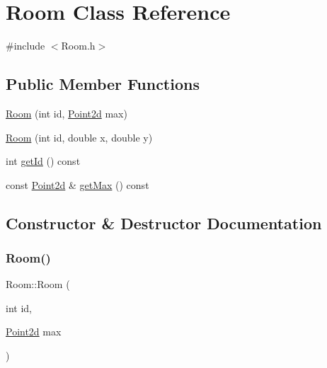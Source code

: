 \hypertarget{class_room}{}\section{Room Class Reference}
\label{class_room}


{\ttfamily \#include $<$Room.\+h$>$}

\subsection*{Public Member Functions}
\begin{DoxyCompactItemize}
\item 
\hyperlink{class_room_aa376bf97fea323a0c6ce14d7edbf58b9}{Room} (int id, \hyperlink{class_point2d}{Point2d} max)
\item 
\hyperlink{class_room_a441eb59beaafd66cee7c84fdea151ab1}{Room} (int id, double x, double y)
\item 
int \hyperlink{class_room_a416c1fe7e1338a64c2781becf17e85dd}{get\+Id} () const
\item 
const \hyperlink{class_point2d}{Point2d} \& \hyperlink{class_room_ad53da98167994fc819724187bc837096}{get\+Max} () const
\end{DoxyCompactItemize}


\subsection{Constructor \& Destructor Documentation}
\mbox{\label{class_room_aa376bf97fea323a0c6ce14d7edbf58b9}} 
\subsubsection{\texorpdfstring{Room()}{Room()}\hspace{0.1cm}{\footnotesize\ttfamily [1/2]}}
{\footnotesize\ttfamily Room\+::\+Room (\begin{DoxyParamCaption}\item[{int}]{id,  }\item[{\hyperlink{class_point2d}{Point2d}}]{max }\end{DoxyParamCaption})\hspace{0.3cm}{\ttfamily [inline]}}

\mbox{\label{class_room_a441eb59beaafd66cee7c84fdea151ab1}} 
